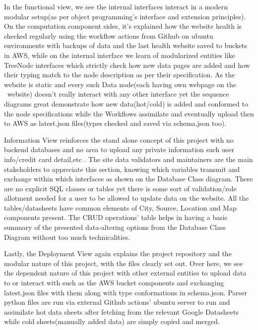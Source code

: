 In the functional view, we see the internal interfaces interact in a modern modular setup(as per object programming's interface and extension principles). On the computation component sides, it's explained how the website health is checked regularly using the workflow actions from Github on ubuntu environments with backups of data and the last health website saved to buckets in AWS, while on the internal interface we learn of modularized entities like TreeNode interfaces which strictly check how new data pages are added and how their typing match to the node description as per their specification. As the website is static and every such Data node(each having own webpage on the \afetbilgi\ website) doesn't really interact with any other interface yet the sequence diagrams great demonstrate how new data(hot/cold) is added and conformed to the node specifications while the Workflows assimilate and eventually upload then to AWS as latest.json files(types checked and saved via schema.json too). 

Information View reinforces the stand alone concept of this project with no backend databases and no area to upload any private information such user info/credit card detail,etc . The site data validators and maintainers  are the main stakeholders to appreciate this section, knowing which variables transmit and exchange within which interfaces as shown on the Database Class diagram. There are no explicit SQL classes or tables yet there is some sort of validation/role allotment needed for a user to be allowed to update data on the website. All the tables/datasheets have common elements of City, Source, Location and Map components present. The CRUD operations' table helps in having a basic summary of the presented data-altering options from the Database Class Diagram without too much technicalities. 

\vspace*{\fill}
\newpage

Lastly, the Deployment View again explains the project repository and the modular nature of this project, with the files clearly set out. Over here, we see the dependent nature of this project with other external entities to upload data to or interact with such as the AWS bucket components and exchanging latest.json files with them along with type conformations in schema.json. Parser python files are run via external Github actions' ubuntu server to run and assimilate hot data sheets after fetching from the relevant Google Datasheets while cold sheets(manually added data) are simply copied and merged.
